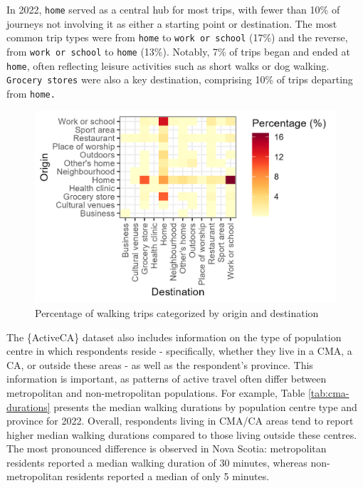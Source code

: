 \documentclass[Royal,times,sageh]{sagej}
\begin{document}
In 2022, \texttt{home} served as a central hub for most trips, with
fewer than 10\% of journeys not involving it as either a starting point
or destination. The most common trip types were from \texttt{home} to
\texttt{work\ or\ school} (17\%) and the reverse, from
\texttt{work\ or\ school} to \texttt{home} (13\%). Notably, 7\% of trips
began and ended at \texttt{home}, often reflecting leisure activities
such as short walks or dog walking. \texttt{Grocery\ stores} were also a
key destination, comprising 10\% of trips departing from \texttt{home.}

\begin{figure}

{\centering \includegraphics[width=1\linewidth]{Manuscript-figures/walking_hm_2022} 

}

\caption{Percentage of walking trips categorized by origin and destination}\label{fig:figure-01}
\end{figure}

The \{ActiveCA\} dataset also includes information on the type of
population centre in which respondents reside - specifically, whether
they live in a CMA, a CA, or outside these areas - as well as the
respondent's province. This information is important, as patterns of
active travel often differ between metropolitan and non-metropolitan
populations. For example, Table \ref{tab:cma-durations} presents the
median walking durations by population centre type and province for
2022. Overall, respondents living in CMA/CA areas tend to report higher
median walking durations compared to those living outside these centres.
The most pronounced difference is observed in Nova Scotia: metropolitan
residents reported a median walking duration of 30 minutes, whereas
non-metropolitan residents reported a median of only 5 minutes.
\end{document}
